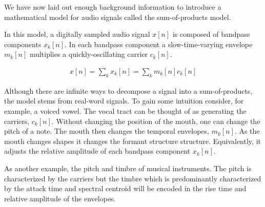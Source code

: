 \documentclass [11pt, proquest,oneside] {ganter_thesis}[2015/03/03]
\begin{document}
We have now laid out enough background information to introduce a mathematical model for audio signals called the sum-of-products model.

In this model, a digitally sampled audio signal $x[n]$ is composed of bandpass components $x_k[n]$.  In each bandpass component a slow-time-varying envelope $m_k[n]$ multiplies a quickly-oscillating carrier $c_k[n]$.

\begin{align}
\label{eq:sum-of-products}
x[n] = \sum\limits_k x_k[n] = \sum\limits_k m_k[n] c_k[n]
\end{align}

Although there are infinite ways to decompose a signal into a sum-of-products, the model stems from real-word signals.  To gain some intuition consider, for example, a voiced vowel.  The vocal tract can be thought of as generating the carriers, $c_k[n]$.  Without changing the position of the mouth, one can change the pitch of a note.  The mouth then changes the temporal envelopes, $m_k[n]$.  As the mouth changes shapes it changes the formant structure structure.  Equivalently, it adjusts the relative amplitude of each bandpass component $x_k[n]$.

As another example, the pitch and timbre of musical instruments.  The pitch is characterized by the carriers but the timbre which is predominantly characterized by the attack time and spectral centroid \cite{kong2011temporal} will be encoded in the rise time and relative amplitude of the envelopes.


\end{document}

